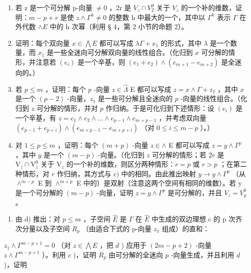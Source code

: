 \begin{enumerate}
\def\labelenumi{\alph{enumi})}
\item
  若 z 是一个可分解 p-向量 \(\neq0\) ，2r 是 \(V_{z}\cap V_{2}^{0}\) 关于 \(V_{z}\) 的一个补的维数，证明：\(m-p+r\) 是使 \(z\wedge\Gamma^{h}\neq0\) 的整数 h 中最大的一个，其中以 \(\Gamma^{h}\) 表示 \(\Gamma\) 在外代数 \(\wedge E\) 中的 h 次幂（利用 § 4，第 2 小节的命题 2）。
\item
  证明：每个双向量 \(x \in \bigwedge E\) 都可以写成 \(\lambda \Gamma + x_{1}\) 的形式，其中 \(\lambda\) 是一个数量，而 \(x_{1}\) 是一些全迷向可分解双向量的线性组合。（化归到 \(x\) 可分解的情形，并注意若 \((e_{i})\) 是一个辛基，则 \((e_{1} + e_{2}) \wedge (e_{m+1} - e_{m+2})\) 是全迷向的。）
\item
  若 \(p \leqslant m\) ，证明：每个 \(p\) -向量 \(z \in \hat{\Lambda}\) E 都可以写成 \(z = x \wedge \Gamma + z_1\) ，其中 \(x\) 是一个 \((p - 2)\) -向量，\(z_1\) 是一些可分解且全迷向的 \(p\) -向量的线性组合。（化归到 \(z\) 可分解的情形，并对 \(p\) 作归纳。于是可化归到下述情形：设 \((e_i)\) 是一个辛基，有 \(z = e_1 \wedge e_2 \wedge \ldots \wedge e_{p-1} \wedge e_{m+p-1}\) ，并考虑双向量 \((e_{p-1} + e_{p+i}) \wedge (e_{m+p-1} - e_{m+p+i})\) （对 \(0 \leqslant i \leqslant m - p\) ）。）
\item
  对 \(1 \leqslant p \leqslant m\) ，证明：每个 \((m+p)\) -向量 \(z \in \wedge\) E 都可以写成 \(z = y \wedge \Gamma^p\) ，其中 \(y\) 是一个 \((m-p)\) -向量。（化归到 \(z\) 可分解的情形；若 \(2r\) 是 \(\mathrm{V}_z \cap \mathrm{V}_z^0\) 关于 \(\mathrm{V}_z\) 的一个补的维数，则区分两种情形：\(r = p\) 或 \(r > p\) ；在第二种情形，对 \(r\) 作归纳，其方式与 \(c)\) 中的相同。由此推出映射 \(y \to y \wedge \Gamma^p\) （从 \(\wedge^{m-p}\) E 到 \(\wedge^{m+p}\) E 中的）是双射（注意这两个空间有相同的维数）。若 y 是一个可分解的 \((m-p)\) -向量，证明 \(z = y \wedge \Gamma^{p}\) 是可分解的，并且 \(V_{z} = V_{y}^{0}\) 。
\end{enumerate}

\begin{enumerate}
\def\labelenumi{\alph{enumi})}
\setcounter{enumi}{4}
\tightlist
\item
  由 d) 推出：对 \(p \leqslant m\) ，子空间 \(\hat{E}\) 是 \(\Gamma\) 在 \(\hat{E}\) 中生成的双边理想 c 的 p 次齐次分量以及子空间 \(R_{p}\) （由适合下式的 p-向量 \(z_{1}\) 组成）的直和：
\end{enumerate}

\(z_{1} \wedge \Gamma^{m-p+1} = 0\) （对 \(z \in \bigwedge E\) ，把 \(d\) ) 应用于 \((2m - p + 2)\) -向量 \(z \wedge \Gamma^{m-p+1}\) ）。利用 \(c\) )，证明 \(R_{p}\) 由可分解的全迷向 \(p\) -向量生成，并且利用 \(d\) )，证明

